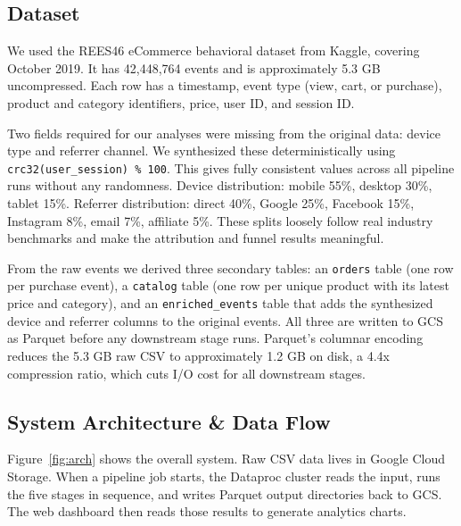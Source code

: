 \documentclass[letterpaper,twocolumn,10pt]{article}
\begin{document}
\subsection{Dataset}

We used the REES46 eCommerce behavioral dataset from Kaggle, covering October 2019.
It has 42,448,764 events and is approximately 5.3 GB uncompressed. Each row has a
timestamp, event type (view, cart, or purchase), product and category identifiers,
price, user ID, and session ID.

Two fields required for our analyses were missing from the original data: device type
and referrer channel. We synthesized these deterministically using
\texttt{crc32(user\_session) \% 100}. This gives fully consistent values across all
pipeline runs without any randomness. Device distribution: mobile 55\%, desktop 30\%,
tablet 15\%. Referrer distribution: direct 40\%, Google 25\%, Facebook 15\%,
Instagram 8\%, email 7\%, affiliate 5\%. These splits loosely follow real industry
benchmarks and make the attribution and funnel results meaningful.

From the raw events we derived three secondary tables: an \texttt{orders} table (one
row per purchase event), a \texttt{catalog} table (one row per unique product with
its latest price and category), and an \texttt{enriched\_events} table that adds the
synthesized device and referrer columns to the original events. All three are written
to GCS as Parquet before any downstream stage runs. Parquet's columnar encoding
reduces the 5.3 GB raw CSV to approximately 1.2 GB on disk, a 4.4x compression
ratio, which cuts I/O cost for all downstream stages.

\subsection{System Architecture \& Data Flow}

Figure~\ref{fig:arch} shows the overall system. Raw CSV data lives in Google Cloud
Storage. When a pipeline job starts, the Dataproc cluster reads the input, runs the
five stages in sequence, and writes Parquet output directories back to GCS. The web
dashboard then reads those results to generate analytics charts.
\end{document}
